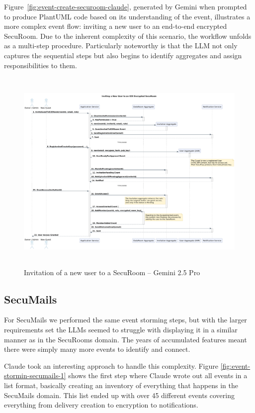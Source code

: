   Figure~\ref{fig:event-create-securoom-claude}, generated by Gemini when prompted to produce PlantUML code based on its understanding of the event, illustrates a more complex event flow: inviting a new user to an end-to-end encrypted SecuRoom. Due to the inherent complexity of this scenario, the workflow unfolds as a multi-step procedure. Particularly noteworthy is that the LLM not only captures the sequential steps but also begins to identify aggregates and assign responsibilities to them.


  \begin{figure}[H]
    \centering
    \begin{adjustbox}{max width=\textwidth}
        \includegraphics[height=10cm]{figures/invitaion-new-user-gemini.png} 
    \end{adjustbox}
    \caption{Invitation of a new user to a SecuRoom – Gemini 2.5 Pro}
    \label{fig:event-invite-new-user-gemini} 
\end{figure}

  \subsection{SecuMails}

  For SecuMails we performed the same event storming steps, but with the larger requirements set the LLMs seemed to struggle with displaying it in a similar manner as in the SecuRooms domain. The years of accumulated features meant there were simply many more events to identify and connect.
  
  Claude took an interesting approach to handle this complexity. Figure \ref{fig:event-stormin-secumails-1} shows the first step where Claude wrote out all events in a list format, basically creating an inventory of everything that happens in the SecuMails domain. This list ended up with over 45 different events covering everything from delivery creation to encryption to notifications.
  
